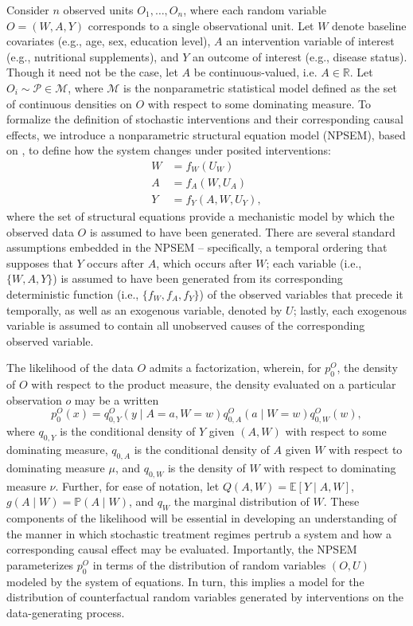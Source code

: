 \documentclass[12pt, krantz2,]{book}
\theoremstyle{definition}
\theoremstyle{definition}
\theoremstyle{definition}
\renewcommand{\P}{\mathbb{P}}
\newcommand{\R}{\mathbb{R}}
\newcommand{\E}{\mathbb{E}}
\newcommand{\M}{\mathcal{M}}
\newcommand{\1}{\mathbbm{1}}
\begin{document}
Consider \(n\) observed units \(O_1, \ldots, O_n\), where each random variable \(O = (W, A, Y)\) corresponds to a single observational unit. Let \(W\) denote baseline
covariates (e.g., age, sex, education level), \(A\) an intervention variable of
interest (e.g., nutritional supplements), and \(Y\) an outcome of interest (e.g.,
disease status). Though it need not be the case, let \(A\) be continuous-valued,
i.e. \(A \in \R\). Let \(O_i \sim \mathcal{P} \in \M\), where \(\M\) is the
nonparametric statistical model defined as the set of continuous densities on
\(O\) with respect to some dominating measure. To formalize the definition of
stochastic interventions and their corresponding causal effects, we introduce a
nonparametric structural equation model (NPSEM), based on \citet{pearl2009causality},
to define how the system changes under posited interventions:
\begin{align}
  W &= f_W(U_W) \\ A &= f_A(W, U_A) \\ Y &= f_Y(A, W, U_Y),
  \label{eq:npsem-shift}
\end{align}
where the set of structural equations provide a mechanistic model by which the
observed data \(O\) is assumed to have been generated. There are several standard
assumptions embedded in the NPSEM -- specifically, a temporal ordering that
supposes that \(Y\) occurs after \(A\), which occurs after \(W\); each variable (i.e.,
\(\{W, A, Y\}\)) is assumed to have been generated from its corresponding
deterministic function (i.e., \(\{f_W, f_A, f_Y\}\)) of the observed variables
that precede it temporally, as well as an exogenous variable, denoted by \(U\);
lastly, each exogenous variable is assumed to contain all unobserved causes of
the corresponding observed variable.

The likelihood of the data \(O\) admits a factorization, wherein, for \(p_0^O\),
the density of \(O\) with respect to the product measure, the density evaluated
on a particular observation \(o\) may be a written
\begin{equation}
  p_0^O(x) = q^O_{0,Y}(y \mid A = a, W = w) q^O_{0,A}(a \mid W = w)
  q^O_{0,W}(w),
  \label{eq:likelihood-factorization}
\end{equation}
where \(q_{0, Y}\) is the conditional density of \(Y\) given \((A, W)\) with respect
to some dominating measure, \(q_{0, A}\) is the conditional density of \(A\) given
\(W\) with respect to dominating measure \(\mu\), and \(q_{0, W}\) is the density of
\(W\) with respect to dominating measure \(\nu\). Further, for ease of notation, let
\(Q(A, W) = \E[Y \mid A, W]\), \(g(A \mid W) = \P(A \mid W)\), and \(q_W\) the
marginal distribution of \(W\). These components of the likelihood will be
essential in developing an understanding of the manner in which stochastic
treatment regimes pertrub a system and how a corresponding causal effect may be
evaluated. Importantly, the NPSEM parameterizes \(p_0^O\) in terms of the
distribution of random variables \((O, U)\) modeled by the system of equations. In
turn, this implies a model for the distribution of counterfactual random
variables generated by interventions on the data-generating process.
\end{document}
